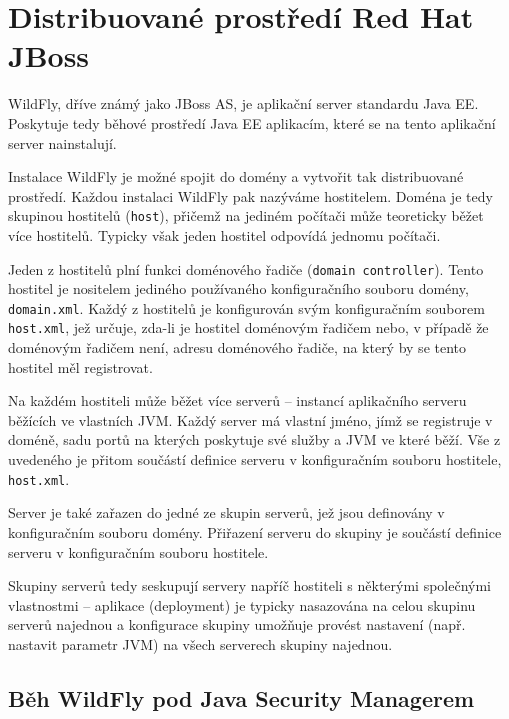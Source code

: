 \chapter{Distribuované prostředí Red Hat JBoss}

WildFly, dříve známý jako JBoss AS, je aplikační server standardu Java EE. Poskytuje tedy běhové prostředí Java EE aplikacím, které se na tento aplikační server nainstalují.

Instalace WildFly je možné spojit do domény a vytvořit tak distribuované prostředí. Každou instalaci WildFly pak nazýváme hostitelem. Doména je tedy skupinou hostitelů ({\tt host}), přičemž na jediném počítači může teoreticky běžet více hostitelů. Typicky však jeden hostitel odpovídá jednomu počítači.

Jeden z hostitelů plní funkci doménového řadiče ({\tt domain controller}). Tento hostitel je nositelem jediného používaného konfiguračního souboru domény, {\tt domain.xml}. Každý z hostitelů je konfigurován svým konfiguračním souborem {\tt host.xml}, jež určuje, zda-li je hostitel doménovým řadičem nebo, v případě že doménovým řadičem není, adresu doménového řadiče, na který by se tento hostitel měl registrovat. \cite{jbossDomainSetup}

Na každém hostiteli může běžet více serverů -- instancí aplikačního serveru běžících ve vlastních JVM. Každý server má vlastní jméno, jímž se registruje v doméně, sadu portů na kterých poskytuje své služby a JVM ve které běží. Vše z uvedeného je přitom součástí definice serveru v konfiguračním souboru hostitele, {\tt host.xml}. \cite{jbossDomainSetup}

Server je také zařazen do jedné ze skupin serverů, jež jsou definovány v konfiguračním souboru domény. Přiřazení serveru do skupiny je součástí definice serveru v konfiguračním souboru hostitele. \cite{jbossDomainSetup}

Skupiny serverů tedy seskupují servery napříč hostiteli s některými společnými vlastnostmi -- aplikace (deployment) je typicky nasazována na celou skupinu serverů najednou a konfigurace skupiny umožňuje provést nastavení (např. nastavit parametr JVM) na všech serverech skupiny najednou. \cite{jbossDomainSetup}

\section{Běh WildFly pod Java Security Managerem}

